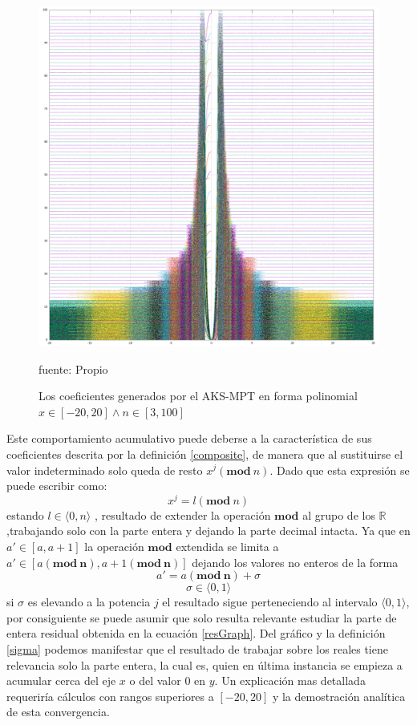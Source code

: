 \documentclass[a4paper, 12pt]{article}
\begin{document}
\begin{figure}[h!]
	\centering
	\includegraphics[width=0.8\linewidth, height=0.4\textheight]{plot}
	\caption[AKS-MPT sobre indeterminada $\mathbb{R}$]{Los coeficientes generados por el AKS-MPT en forma polinomial $x \in [-20,20] \land n \in [3,100]$}
	\small{fuente: Propio}
	\label{fig:nonaksmodp}
\end{figure}

Este comportamiento acumulativo puede deberse a la característica de sus coeficientes descrita por la definición \ref{composite}, de manera que al sustituirse el valor indeterminado solo queda de resto $x^{j} (\mathbf{mod}\ n)$.
Dado que esta expresión se puede escribir como:
\begin{equation}\label{resGraph}
	x^{j} = l (\mathbf{mod}\ n)
\end{equation}
estando $l \in \langle0,n\rangle$ , resultado de extender la operación $\mathbf{mod}$ al grupo de los $\mathbb{R}$ ,trabajando solo con la parte entera y dejando la parte decimal intacta.
Ya que en $a' \in [a,a+1]$ la operación $\mathbf{mod}$ extendida se limita a
$a' \in [a (\mathbf{mod\ n}),a+1(\mathbf{mod\ n})]$ dejando los valores no enteros de la forma
\begin{equation}\label{sigma}
	a' = a (\mathbf{mod\ n}) + \sigma
\end{equation}
\[\sigma \in \langle0,1\rangle \]
si $\sigma$ es elevando a la potencia $j$ el resultado sigue perteneciendo al intervalo $ \langle0,1\rangle$, por consiguiente se puede asumir que solo resulta relevante estudiar la parte de entera residual obtenida en la ecuación \ref{resGraph}.
Del gráfico y la definición \ref{sigma} podemos manifestar que el resultado de trabajar sobre los reales tiene relevancia solo la parte entera, la cual es, quien en última instancia se empieza a acumular cerca del eje $x$ o del valor $0$ en $y$.
Un explicación mas detallada requeriría cálculos con rangos superiores a $[-20,20]$ y la demostración analítica de esta convergencia.
\end{document}
